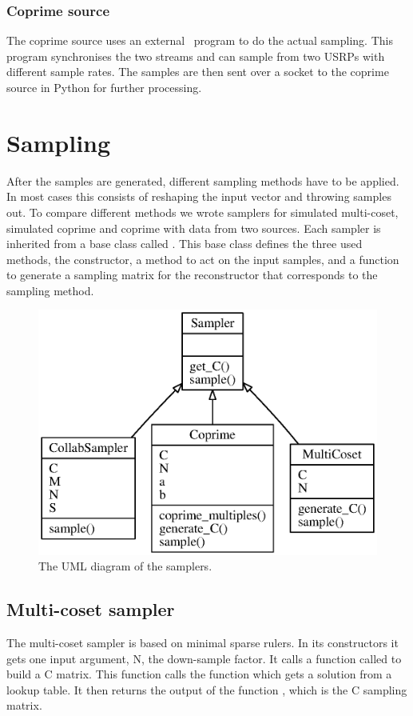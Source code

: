 \documentclass[a4paper, openany, oneside]{memoir}
\begin{document}
\subsubsection{Coprime source}
The coprime source uses an external \CC~program to do the actual sampling. This program synchronises the two streams and can sample from two USRPs with different sample rates. The samples are then sent over a socket to the coprime source in Python for further processing.


\section{Sampling}
\label{sec:sampling}
After the samples are generated, different sampling methods have to be applied. In most cases this consists of reshaping the input vector and throwing samples out. To compare different methods we wrote samplers for simulated multi-coset, simulated coprime and coprime with data from two sources. Each sampler is inherited from a base class called . This base class defines the three used methods, the constructor, a  method to act on the input samples, and a  function to generate a sampling matrix for the reconstructor that corresponds to the sampling method.

\begin{figure}
    \centering
    \includegraphics{./figures/classes_sampling.eps}
    \caption{The UML diagram of the samplers.}
    \label{fig:}
\end{figure}

\subsection{Multi-coset sampler}
\label{sec:multi-coset-sampler}
The multi-coset sampler is based on minimal sparse rulers. In its constructors it gets one input argument, N, the down-sample factor. It calls a function called  to build a C matrix. This function calls the function  which gets a solution from a lookup table. It then returns the output of the function , which is the C sampling matrix.
\end{document}
